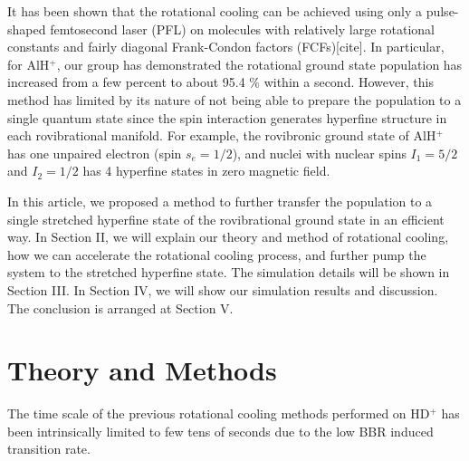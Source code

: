 \documentclass[aip,jcp,reprint]{revtex4-1}
\begin{document}
It has been shown that the rotational cooling can be achieved using only a pulse-shaped femtosecond laser (PFL) on molecules with relatively large rotational constants and fairly diagonal Frank-Condon factors (FCFs)[cite]. In particular, for AlH$^+$, our group has demonstrated the rotational ground state population has increased from a few percent to about 95.4 $\%$ within a second\cite{lien2014broadband}. However, this method has limited by its nature of not being able to prepare the population to a single quantum state since the spin interaction generates hyperfine structure in each rovibrational manifold. For example, the rovibronic ground state of AlH$^+$ has one unpaired electron (spin $s_{e}=1/2$), and nuclei with nuclear spins $I_{1}=5/2$ and $I_{2}=1/2$ has 4 hyperfine states in zero magnetic field.\par
In this article, we proposed a method to further transfer the population to a single stretched hyperfine state of the rovibrational ground state in an efficient way. In Section II, we will explain our theory and method of rotational cooling, how we can accelerate the rotational cooling process, and further pump the system to the stretched hyperfine state. The simulation details will be shown in Section III. In Section IV, we will show our simulation results and discussion. The conclusion is arranged at Section V.\par


\section{Theory and Methods}
The time scale of the previous rotational cooling methods performed on HD$^+$ has been intrinsically limited to few tens of seconds due to the low BBR induced transition rate. 
\end{document}
